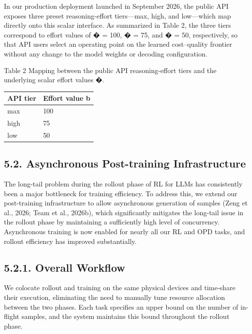 \documentclass[
  10
]{article}
\newcounter{none} %
\begin{document}
In our production deployment launched in September 2026, the public API
exposes three preset reasoning-effort tiers---max, high, and low---which
map directly onto this scalar interface. As summarized in Table 2, the
three tiers correspond to effort values of � = 100, � = 75, and � = 50,
respectively, so that API users select an operating point on the learned
cost--quality frontier without any change to the model weights or
decoding configuration.

Table 2 \textbar{} Mapping between the public API reasoning-effort tiers
and the underlying scalar effort values �.

{\def\LTcaptype{none} %
\begin{longtable}[]{@{}|l|l|@{}}
\toprule\noalign{}
\endhead
\bottomrule\noalign{}
\endlastfoot
\hline
API tier & Effort value b \\
\hline
max & 100 \\
\hline
high & 75 \\
\hline
low & 50 \\
\hline
\end{longtable}
}

\subsection{5.2. Asynchronous Post-training
Infrastructure}\label{asynchronous-post-training-infrastructure}

The long-tail problem during the rollout phase of RL for LLMs has
consistently been a major bottleneck for training efficiency. To address
this, we extend our post-training infrastructure to allow asynchronous
generation of samples (Zeng et al., 2026; Team et al., 2026b), which
significantly mitigates the long-tail issue in the rollout phase by
maintaining a sufficiently high level of concurrency. Asynchronous
training is now enabled for nearly all our RL and OPD tasks, and rollout
efficiency has improved substantially.

\subsection{5.2.1. Overall Workflow}\label{overall-workflow}

We colocate rollout and training on the same physical devices and
time-share their execution, eliminating the need to manually tune
resource allocation between the two phases. Each task specifies an upper
bound on the number of in-flight samples, and the system maintains this
bound throughout the rollout phase.
\end{document}
